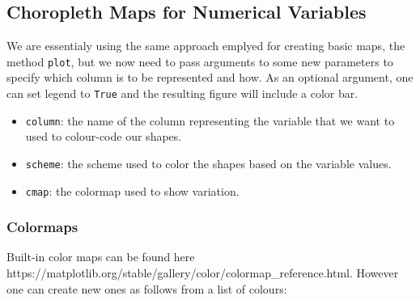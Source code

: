 \documentclass[
  letterpaper,
  DIV=11,
  numbers=noendperiod]{scrreprt}
\providecommand{\tightlist}{%
  \setlength{\itemsep}{0pt}\setlength{\parskip}{0pt}}\usepackage{longtable,booktabs,array}
\begin{document}
\subsection{Choropleth Maps for Numerical
Variables}\label{choropleth-maps-for-numerical-variables}

We are essentialy using the same approach emplyed for creating basic
maps, the method \texttt{plot}, but we now need to pass arguments to
some new parameters to specify which column is to be represented and
how. As an optional argument, one can set legend to \texttt{True} and
the resulting figure will include a color bar.

\begin{itemize}
\tightlist
\item
  \texttt{column}: the name of the column representing the variable that
  we want to used to colour-code our shapes.
\item
  \texttt{scheme}: the scheme used to color the shapes based on the
  variable values.
\item
  \texttt{cmap}: the colormap used to show variation.
\end{itemize}

\subsubsection{Colormaps}\label{colormaps}

Built-in color maps can be found here
https://matplotlib.org/stable/gallery/color/colormap\_reference.html.
However one can create new ones as follows from a list of colours:
\end{document}
